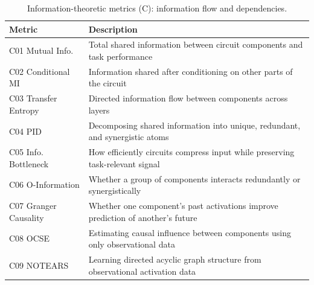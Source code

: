 \documentclass[10pt]{article}
\begin{document}
\begin{table}[H]
\centering
\small
\caption{Information-theoretic metrics (C): information flow and dependencies.}
\renewcommand{\arraystretch}{1.12}
\begin{tabular}{@{}lp{10cm}@{}}
\toprule
\textbf{Metric} & \textbf{Description} \\
\midrule
C01 Mutual Info. & Total shared information between circuit components and task performance \\
C02 Conditional MI & Information shared after conditioning on other parts of the circuit \\
C03 Transfer Entropy & Directed information flow between components across layers \\
C04 PID & Decomposing shared information into unique, redundant, and synergistic atoms \\
C05 Info. Bottleneck & How efficiently circuits compress input while preserving task-relevant signal \\
C06 O-Information & Whether a group of components interacts redundantly or synergistically \\
C07 Granger Causality & Whether one component's past activations improve prediction of another's future \\
C08 OCSE & Estimating causal influence between components using only observational data \\
C09 NOTEARS & Learning directed acyclic graph structure from observational activation data \\
\bottomrule
\end{tabular}
\end{table}
\end{document}
